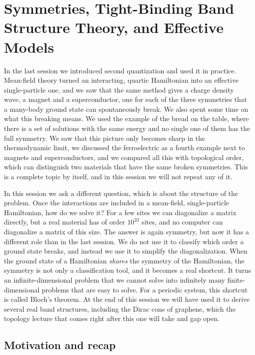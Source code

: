 \chapter{Symmetries, Tight-Binding Band Structure Theory, and Effective Models}

In the last session we introduced second quantization and used it in practice. Mean-field theory
turned an interacting, quartic Hamiltonian into an effective single-particle one, and we saw that
the same method gives a charge density wave, a magnet and a superconductor, one for each of the
three symmetries that a many-body ground state can spontaneously break. We also spent some time on
what this breaking means. We used the example of the bread on the table, where there is a set of
solutions with the same energy and no single one of them has the full symmetry. We saw that this
picture only becomes sharp in the thermodynamic limit, we discussed the ferroelectric as a fourth
example next to magnets and superconductors, and we compared all this with topological order, which
can distinguish two materials that have the same broken symmetries. This is a complete topic by
itself, and in this session we will not repeat any of it.

In this session we ask a different question, which is about the structure of the problem. Once
the interactions are included in a mean-field, single-particle Hamiltonian, how do we solve it? For a
few sites we can diagonalize a matrix directly, but a real material has of order $10^{23}$ sites,
and no computer can diagonalize a matrix of this size. The answer is again symmetry, but now it has a
different role than in the last session. We do not use it to classify which order a ground state
breaks, and instead we use it to simplify the diagonalization. When the ground state of a
Hamiltonian \emph{shares} the symmetry of the Hamiltonian, the symmetry is not only a classification
tool, and it becomes a real shortcut. It turns an infinite-dimensional problem that we cannot solve
into infinitely many finite-dimensional problems that are easy to solve. For a periodic system, this
shortcut is called Bloch's theorem. At the end of this session we will have used it to derive
several real band structures, including the Dirac cone of graphene, which the topology lecture that
comes right after this one will take and gap open.

\section{Motivation and recap}

